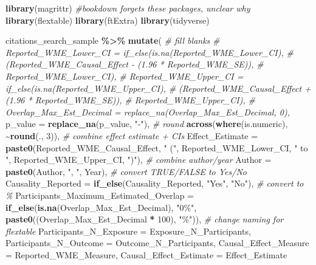 \documentclass[
]{article}
\newenvironment{Shaded}{\begin{snugshade}}{\end{snugshade}}
\newcommand{\AttributeTok}[1]{\textcolor[rgb]{0.13,0.29,0.53}{#1}}
\newcommand{\CommentTok}[1]{\textcolor[rgb]{0.56,0.35,0.01}{\textit{#1}}}
\newcommand{\DecValTok}[1]{\textcolor[rgb]{0.00,0.00,0.81}{#1}}
\newcommand{\FunctionTok}[1]{\textcolor[rgb]{0.13,0.29,0.53}{\textbf{#1}}}
\newcommand{\NormalTok}[1]{#1}
\newcommand{\SpecialCharTok}[1]{\textcolor[rgb]{0.81,0.36,0.00}{\textbf{#1}}}
\newcommand{\StringTok}[1]{\textcolor[rgb]{0.31,0.60,0.02}{#1}}
\begin{document}
\begin{landscape}

\begin{Shaded}
\begin{Highlighting}[]
\FunctionTok{library}\NormalTok{(magrittr) }\CommentTok{\#bookdown forgets these packages, unclear why}
\FunctionTok{library}\NormalTok{(flextable)}
\FunctionTok{library}\NormalTok{(ftExtra)}
\FunctionTok{library}\NormalTok{(tidyverse)}

\NormalTok{citations\_search\_sample }\SpecialCharTok{\%\textgreater{}\%} 
  \FunctionTok{mutate}\NormalTok{(}
    \CommentTok{\# fill blanks}
    \CommentTok{\# Reported\_WME\_Lower\_CI = if\_else(is.na(Reported\_WME\_Lower\_CI), }
    \CommentTok{\#                                 (Reported\_WME\_Causal\_Effect {-} (1.96 * Reported\_WME\_SE)),}
    \CommentTok{\#                                 Reported\_WME\_Lower\_CI),}
    \CommentTok{\# Reported\_WME\_Upper\_CI = if\_else(is.na(Reported\_WME\_Upper\_CI),}
    \CommentTok{\#                                 (Reported\_WME\_Causal\_Effect + (1.96 * Reported\_WME\_SE)),}
    \CommentTok{\#                                 Reported\_WME\_Upper\_CI),}
    \CommentTok{\# Overlap\_Max\_Est\_Decimal = replace\_na(Overlap\_Max\_Est\_Decimal, 0),}
    \AttributeTok{p\_value =} \FunctionTok{replace\_na}\NormalTok{(p\_value, }\StringTok{"{-}"}\NormalTok{),}
    \CommentTok{\# round}
    \FunctionTok{across}\NormalTok{(}\FunctionTok{where}\NormalTok{(is.numeric), }\SpecialCharTok{\textasciitilde{}}\FunctionTok{round}\NormalTok{(., }\DecValTok{3}\NormalTok{)),}
    \CommentTok{\# combine effect estimate + CIs}
    \AttributeTok{Effect\_Estimate =} \FunctionTok{paste0}\NormalTok{(Reported\_WME\_Causal\_Effect, }\StringTok{" ("}\NormalTok{, Reported\_WME\_Lower\_CI, }\StringTok{" to "}\NormalTok{, Reported\_WME\_Upper\_CI, }\StringTok{")"}\NormalTok{),}
    \CommentTok{\# combine author/year}
    \AttributeTok{Author =} \FunctionTok{paste0}\NormalTok{(Author, }
                    \StringTok{", "}\NormalTok{,}
\NormalTok{                    Year),}
    \CommentTok{\# convert TRUE/FALSE to Yes/No}
    \AttributeTok{Causality\_Reported =} \FunctionTok{if\_else}\NormalTok{(Causality\_Reported, }\StringTok{"Yes"}\NormalTok{, }\StringTok{"No"}\NormalTok{),}
    \CommentTok{\# convert to \%}
    \AttributeTok{Participants\_Maximum\_Estimated\_Overlap =} \FunctionTok{if\_else}\NormalTok{(}\FunctionTok{is.na}\NormalTok{(Overlap\_Max\_Est\_Decimal),}
                                                     \StringTok{"0\%"}\NormalTok{,}
                                                     \FunctionTok{paste0}\NormalTok{((Overlap\_Max\_Est\_Decimal }\SpecialCharTok{*} \DecValTok{100}\NormalTok{), }\StringTok{"\%"}\NormalTok{)),}
    \CommentTok{\# change naming for flextable}
    \AttributeTok{Participants\_N\_Exposure =}\NormalTok{ Exposure\_N\_Participants,}
    \AttributeTok{Participants\_N\_Outcome =}\NormalTok{ Outcome\_N\_Participants,}
    \AttributeTok{Causal\_Effect\_Measure =}\NormalTok{ Reported\_WME\_Measure,}
    \AttributeTok{Causal\_Effect\_Estimate =}\NormalTok{ Effect\_Estimate}
    

\end{Highlighting}
\end{Shaded}
\end{landscape}
\end{document}
